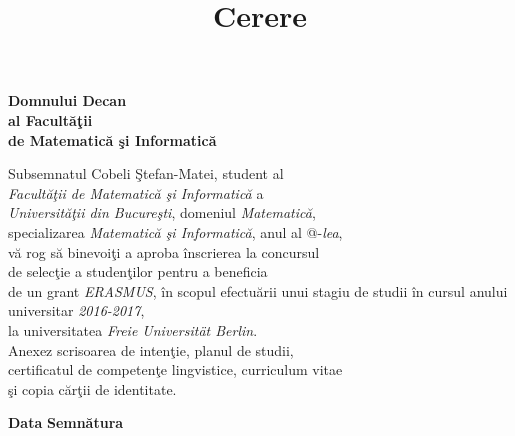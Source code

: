 \documentclass{letter}
\date{\vspace{-5ex}}
\title{Cerere}
\makeatletter
\newcommand*{\rom}[1]{\expandafter\@slowromancap\romannumeral #1@}
\makeatother
\begin{document}

\begin{letter}{  } %

{\Large 
\opening{\textbf{Domnului Decan \\ al Facult\u a\c tii\\ de Matematic\u a \c si Informatic\u a \\ }}

\vspace{2\parskip} %
\vspace{2\parskip}
\vspace{2\parskip}
\vspace{2\parskip} %

Subsemnatul Cobeli \c Stefan-Matei, student al\\ \textit{Facult\u a\c tii de Matematic\u a \c si Informatic\u a} a\\ \textit{Universit\u a\c tii din Bucure\c sti}, domeniul \textit{Matematic\u a},\\ specializarea \textit{Matematic\u a \c si Informatic\u a}, anul al \rom{3}-\textit{lea},\\ v\u a rog s\u a binevoi\c ti a aproba \^ inscrierea la concursul\\ de selec\c tie a studen\c tilor pentru a beneficia\\ de un grant \textit{ERASMUS}, \^ in scopul efectu\u arii unui stagiu de studii \^ in cursul anului universitar \textit{2016-2017},\\ la universitatea \textit{Freie Universit\" at Berlin}.\\

Anexez  scrisoarea de inten\c tie, planul de  studii,\\certificatul de competen\c te lingvistice, curriculum vitae\\ \c si copia c\u ar\c tii de identitate.



\vspace{2\parskip} %
\vspace{2\parskip}
\vspace{2\parskip}
\vspace{2\parskip} %
\noindent \textbf{Data} \hfill \hfill \textbf{Semn\u atura}

\par}

\end{letter}
 
\end{document}

